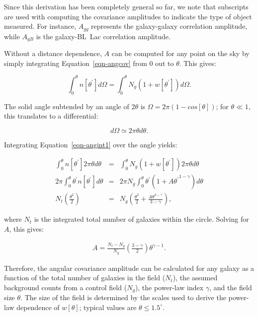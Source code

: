\documentclass[useAMS,usenatbib]{mn2e}
\begin{document}
Since this derivation has been completely general so far, we note that subscripts are used with computing the covariance amplitudes to indicate the type of object measured. For instance, $A_{gg}$ represents the galaxy-galaxy correlation amplitude, while $A_{gB}$ is the galaxy-BL~Lac correlation amplitude. 

Without a distance dependence, $A$ can be computed for any point on the sky by simply integrating Equation~\ref{eqn-angcov} from 0 out to $\theta$. This gives:

\begin{equation}
\label{eqn-angint1}
\int^\theta_0 n[\theta^\prime]d\Omega = \int^\theta_0 N_g (1 + w[\theta^\prime]) d\Omega.
\end{equation}

\noindent The solid angle subtended by an angle of $2\theta$ is $\Omega=2\pi(1-cos[\theta])$; for $\theta\ll1$, this translates to a differential:

\begin{equation}
d\Omega \simeq 2\pi \theta d\theta.
\end{equation}

\noindent Integrating Equation~\ref{eqn-angint1} over the angle yields:

\begin{eqnarray}
\int^\theta_0 n[\theta^\prime] 2 \pi \theta d\theta & = & \int^\theta_0 N_g (1 + w[\theta^\prime]) 2 \pi \theta d\theta \\
2\pi \int^\theta_0 \theta^\prime n[\theta^\prime]d\theta & = & 2 \pi N_g \int^\theta_0 \theta^\prime (1 + A {\theta^\prime}^{1-\gamma}) d\theta \\
N_t \left(\frac{\theta^2}{2}\right) & = & N_g \left(\frac{\theta^2}{2} + \frac{A\theta^{3-\gamma}}{3-\gamma}\right),
\end{eqnarray}

\noindent where $N_t$ is the integrated total number of galaxies within the circle. Solving for $A$, this gives:

\begin{eqnarray}
A = \frac{N_t - N_g}{N_g} \left(\frac{3-\gamma}{2}\right) \theta^{\gamma-1}.
\end{eqnarray}

Therefore, the angular covariance amplitude can be calculated for any galaxy as a function of the total number of galaxies in the field ($N_t$), the assumed background counts from a control field ($N_g$), the power-law index $\gamma$, and the field size $\theta$. The size of the field is determined by the scales used to derive the power-law dependence of $w[\theta]$; typical values are $\theta\leq1.5^\circ$. 
\end{document}
